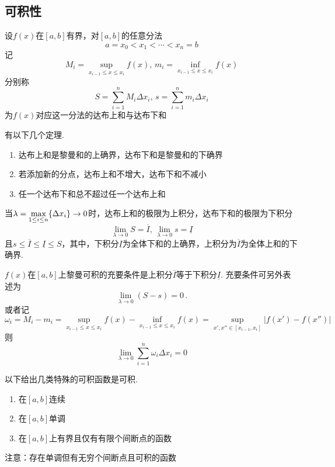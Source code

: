 \subsection{可积性}
\begin{definition}[达布(Darboux)和]
设$f(x)$在$[a,b]$有界，对$[a,b]$的任意分法
\[a=x_0<x_1<\cdots<x_n=b\]
记
\[M_i=\sup_{x_{i-1}\leq x\leq x_i}f(x),\,m_i=\inf_{x_{i-1}\leq x\leq x_i}f(x)\]
分别称
\[S=\sum_{i=1}^nM_i\Delta x_i,\,s=\sum_{i=1}^nm_i\Delta x_i\]
为$f(x)$对应这一分法的达布上和与达布下和
\end{definition}
\par 有以下几个定理.
\begin{theorem}\mbox{}\par
\begin{enumerate}
	\itemsep-3pt
	\item 达布上和是黎曼和的上确界，达布下和是黎曼和的下确界
	\item 若添加新的分点，达布上和不增大，达布下和不减小
	\item 任一个达布下和总不超过任一个达布上和
\end{enumerate}
\end{theorem}
\begin{theorem}[达布定理]
当$\displaystyle\lambda=\max_{1\leq i\leq n}\{\Delta x_i\}\to 0$时，达布上和的极限为上积分，达布下和的极限为下积分
\[\lim_{\lambda\to 0}S=\overline{I},\,\lim_{\lambda\to 0}s=\underline{I}\]
且$s\leq\overline{I}\leq\underline{I}\leq S$，其中，下积分$\underline{I}$为全体下和的上确界，上积分为$\overline{I}$为全体上和的下确界.
\end{theorem}
\begin{theorem}[可积的充要条件]
$f(x)$在$[a,b]$上黎曼可积的充要条件是上积分$\overline{I}$等于下积分$\underline{I}$.
充要条件可另外表述为
\[\lim_{\lambda\to 0}(S-s)=0\,.\]
或者记
\[\omega_i=M_i-m_i=\sup_{x_{i-1}\leq x\leq x_i}f(x)-\inf_{x_{i-1}\leq x\leq x_i}f(x)=\sup_{x',x''\in[x_{i-1},x_i]}|f(x')-f(x'')|\]
则
\[\lim_{\lambda\to 0}\sum_{i=1}^n\omega_i\Delta x_i=0\]
\end{theorem}
\par 以下给出几类特殊的可积函数是可积.
\begin{enumerate}
	\itemsep -3pt
	\item 在$[a,b]$连续
	\item 在$[a,b]$单调
	\item 在$[a,b]$上有界且仅有有限个间断点的函数
\end{enumerate}
\par 注意：存在单调但有无穷个间断点且可积的函数
